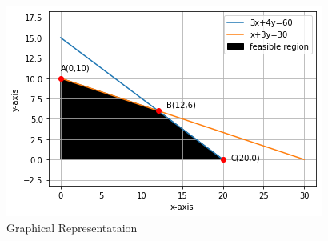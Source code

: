 \begin{itemize}
\begin{figure}[!ht]
\centering
\includegraphics[width=\columnwidth]{solutions/su2021/2/35/Figure 10_1.png}
\caption{Graphical Representataion}
\end{figure}
\end{itemize}

